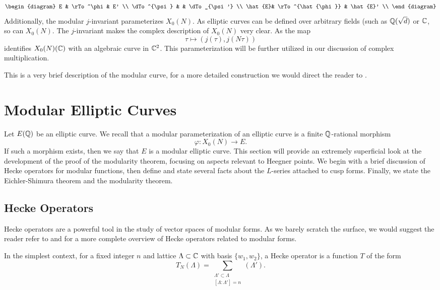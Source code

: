 $$
\def\Assl{{\rm assl}}\def\Id{{\rm id}}
\begin{diagram}
E & \rTo^\phi & E'  \\
\dTo^{\psi} & & \dTo_{\psi'} \\
\hat{E}& \rTo^{\hat{\phi}} & \hat{E}' \\
\end{diagram}
$$
Additionally, the modular $j$-invariant parameterizes $X_0(N)$. As elliptic curves can be defined over arbitrary fields (such as $\mathbb{Q}(\sqrt{d})$ or $\mathbb{C}$, so can $X_0(N)$.  The $j$-invariant makes the complex description of $X_0(N)$ very clear. As the map
$$\tau \mapsto (j(\tau),j(N\tau))$$
identifies $X_0(N)(\mathbb{C})$ with an algebraic curve in $\mathbb{C}^2$. This parameterization will be further utilized in our discussion of complex multiplication.

This is a very brief description of the modular curve, for a more detailed construction we would direct the reader to \cite[Chapter 1]{Shimura1}.


\section{Modular Elliptic Curves}
Let $E(\mathbb{Q})$ be an elliptic curve. We recall that a modular parameterization of an elliptic curve is a finite $\mathbb{Q}$-rational morphism
$$\varphi:X_0(N) \to E.$$
If such a morphism exists, then we say that $E$ is a modular elliptic curve. This section will provide an extremely superficial look at the development of the proof of the modularity theorem, focusing on aspects relevant to Heegner points. We begin with a brief discussion of Hecke operators for modular functions, then define and state several facts about the $L$-series attached to cusp forms. Finally, we state the Eichler-Shimura theorem and the modularity theorem. 


\subsection{Hecke Operators}
Hecke operators are a powerful tool in the study of vector spaces of modular forms. As we barely scratch the surface, we would suggest the reader refer to \cite[Chapter 2]{Darmon2} and \cite[Chapter VII]{Shimura} for a more complete overview of Hecke operators related to modular forms. 

In the simplest context, for a fixed integer $n$ and lattice $\Lambda \subset \mathbb{C}$ with basis $\{w_1,w_2\}$, a Hecke operator is a function $T$ of the form
$$T_N(\Lambda) = \sum_{\begin{matrix}\Lambda' \subset \Lambda \\ [\Lambda:\Lambda']=n \end{matrix}} (\Lambda').$$
 
